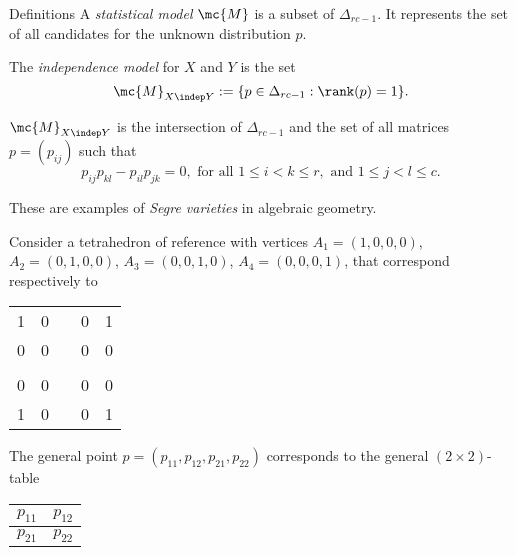 \begin{frame}

    \begin{block}{Definitions}
        A \emph{statistical model} $\mc{M}$ is a subset of $\Delta_{rc-1}$. It represents the set of all candidates for the unknown distribution $p$.

        The \emph{independence model} for $X$ and $Y$ is the set
        $$ \mc{M}_{X \indep Y} := \{ p \in \Delta_{rc - 1} : \rank(p) = 1 \}. $$
    \end{block}

    $\mc{M}_{X \indep Y}$ is the intersection of $\Delta_{rc-1}$ and the set of all matrices $p = (p_{ij})$ such that
    $$ p_{ij}p_{kl} - p_{il}p_{jk} = 0, \text{ for all } 1 \leq i < k \leq r, \text{ and } 1 \leq j < l \leq c. $$

    These are examples of \emph{Segre varieties} in algebraic geometry.

\end{frame}

\begin{frame}

    Consider a tetrahedron of reference with vertices $A_{1} = (1,0,0,0)$, $A_{2} = (0,1,0,0)$, $A_{3} = (0,0,1,0)$, $A_{4} = (0,0,0,1)$, that correspond respectively to

\begin{table}[]
\begin{tabular}{lllll}
\cline{1-2} \cline{4-5}
\multicolumn{1}{|l|}{1} & \multicolumn{1}{l|}{0} & \multicolumn{1}{l|}{} & \multicolumn{1}{l|}{0} & \multicolumn{1}{l|}{1} \\ \cline{1-2} \cline{4-5} 
\multicolumn{1}{|l|}{0} & \multicolumn{1}{l|}{0} & \multicolumn{1}{l|}{} & \multicolumn{1}{l|}{0} & \multicolumn{1}{l|}{0} \\ \cline{1-2} \cline{4-5} 
                        &                        &                       &                        &                        \\ \cline{1-2} \cline{4-5} 
\multicolumn{1}{|l|}{0} & \multicolumn{1}{l|}{0} & \multicolumn{1}{l|}{} & \multicolumn{1}{l|}{0} & \multicolumn{1}{l|}{0} \\ \cline{1-2} \cline{4-5} 
\multicolumn{1}{|l|}{1} & \multicolumn{1}{l|}{0} & \multicolumn{1}{l|}{} & \multicolumn{1}{l|}{0} & \multicolumn{1}{l|}{1} \\ \cline{1-2} \cline{4-5} 
\end{tabular}
\end{table}

The general point $p = (p_{11}, p_{12}, p_{21}, p_{22})$ corresponds to the general $(2 \times 2)$-table

\begin{table}[]
\begin{tabular}{|l|l|}
\hline
$p_{11}$ & $p_{12}$ \\ \hline
$p_{21}$ & $p_{22}$ \\ \hline
\end{tabular}
\end{table}

\end{frame}
